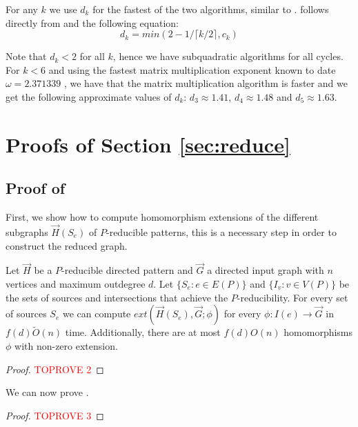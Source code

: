 \documentclass[a4paper,UKenglish,cleveref, autoref, numberwithinsect, thm-restate]{lipics-v2021}
\newcommand{\reducible}[1]{${#1}$-reducible}
\newcommand{\maxoutdeg}{d}
\newcommand{\extension}[3]{ext\left(#1,#2;#3\right)}
\begin{document}
	For any $k$ we use $d_k$ for the fastest of the two algorithms, similar to \cite{GiLeSh+23}.  follows directly from  and the following equation:
	\begin{equation} \label{eq:dk}
		d_k = min(2-1/\lceil k/2 \rceil,c_k)
	\end{equation}

	Note that $d_k < 2$ for all $k$, hence we have subquadratic algorithms for all cycles. For $k<6$ and using the fastest matrix multiplication exponent known to date $\omega = 2.371339$ \cite{AlDuWi+25}, we have that the matrix multiplication algorithm is faster and we get the following approximate values of $d_k$: $d_3 \approx 1.41$, $d_4 \approx 1.48$ and $d_5 \approx 1.63$.
	
	
	
	\newpage
	\appendix
	\section{Proofs of Section \ref{sec:reduce}}
	
	\subsection{Proof of }
	
	First, we show how to compute homomorphism extensions of the different subgraphs $\vec{H}(S_e)$ of \reducible{P} patterns, this is a necessary step in order to construct the reduced graph.
	
	\begin{lemma} \label{lem:extension_subgraphs}
		Let $\vec{H}$ be a \reducible{P} directed pattern and $\vec{G}$ a directed input graph with $n$ vertices and maximum outdegree $\maxoutdeg$. Let $\{S_e : e\in E(P)\}$ and $\{I_v : v\in V(P)\}$ be the sets of sources and intersections that achieve the $P$-reducibility. For every set of sources $S_e$ we can compute $\extension{\vec{H}(S_e)}{\vec{G}}{\phi}$ for every $\phi: I(e) \to \vec{G}$ in $f(\maxoutdeg)\tilde{O}(n)$ time. Additionally, there are at most $f(\maxoutdeg)O(n)$ homomorphisms $\phi$ with non-zero extension.
	\end{lemma}
	\begin{proof}\textcolor{red}{TOPROVE 2}\end{proof}
	
	We can now prove .
	
	\construct*
	\begin{proof}\textcolor{red}{TOPROVE 3}\end{proof}
\end{document}
